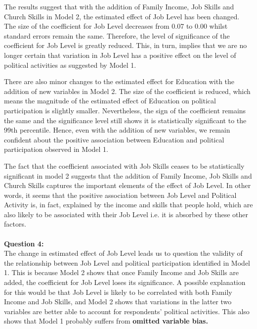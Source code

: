 \documentclass[12pt, letterpaper]{article}
\begin{document}
The results suggest that with the addition of Family Income, Job Skills and Church Skills in Model 2, the estimated effect of Job Level has been changed. The size of the coefficient for Job Level decreases from 0.07 to 0.00 whilst standard errors remain the same. Therefore, the level of significance of the coefficient for Job Level is greatly reduced. This, in turn, implies that we are no longer certain that variation in Job Level has a positive effect on the level of political activities as suggested by Model 1.

There are also minor changes to the estimated effect for Education with the addition of new variables in Model 2. The size of the coefficient is reduced, which means the magnitude of the estimated effect of Education on political participation is slightly smaller. Nevertheless, the sign of the coefficient remains the same and the significance level still shows it is statistically significant to the 99th percentile. Hence, even with the addition of new variables, we remain confident about the positive association between Education and political participation observed in Model 1.

The fact that the coefficient associated with Job Skills ceases to be statistically significant in model 2 suggests that the addition of Family Income, Job Skills and Church Skills captures the important elements of the effect of Job Level. In other words, it seems that the positive association between Job Level and Political Activity is, in fact, explained by the income and skills that people hold, which are also likely to be associated with their Job Level i.e. it is absorbed by these other factors.
\\\\
\textbf{Question 4:}\\
The change in estimated effect of Job Level leads us to question the validity of the relationship between Job Level and political participation identified in Model 1. This is because Model 2 shows that once Family Income and Job Skills are added, the coefficient for Job Level loses its significance. A possible explanation for this would be that Job Level is likely to be correlated with both Family Income and Job Skills, and Model 2 shows that variations in the latter two variables are better able to account for respondents' political activities. This also shows that Model 1 probably suffers from \textbf{omitted variable bias.}
\end{document}
